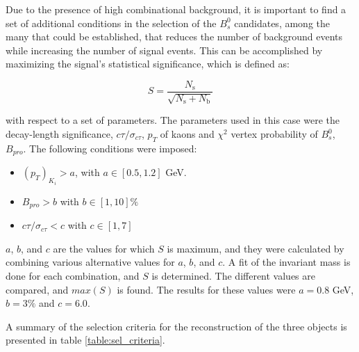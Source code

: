 Due to the presence of high combinational background, it is important to find a set of additional conditions in the selection of the $B^0_s$ candidates, among the many that could be established, that reduces the number of background events while increasing the number of signal events. This can be accomplished by maximizing the signal's statistical significance, which is defined as:

\begin{equation}
	\label{eq:sig}
	S = \frac{N_{\text{s}}}{\sqrt{N_{\text{s}} + N_{\text{b}}}}
\end{equation}

with respect to a set of parameters. The parameters used in this case were the decay-length significance, $c\tau / \sigma_{c\tau}$, $p_T$ of kaons and $\chi^2$ vertex probability of $B^0_s$, $B_{pro}$. The following conditions were imposed:

\begin{itemize}
	\item  $(p_T)_{K_i} > a$, with $a \in [0.5, 1.2]$ GeV.
	\item $B_{pro} > b$ with $b \in [1, 10] \%$ 
	\item $c\tau / \sigma_{c\tau} < c$ with $c \in [1, 7]$
\end{itemize}

$a$, $b$, and $c$ are the values for which $S$ is maximum, and they were calculated by combining various alternative values for $a$, $b$, and $c$. A fit of the invariant mass is done for each combination, and $S$ is determined. The different values are compared, and $max(S)$ is found. The results for these values were $a = 0.8$ GeV, $b = 3\%$ and $c = 6.0$.

A summary of the selection criteria for the reconstruction of the three objects is presented in table \ref{table:sel_criteria}.

